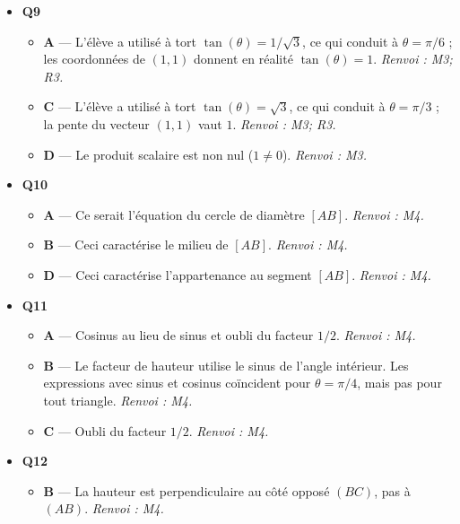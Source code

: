 \begin{itemize}
\begin{itemize}
    \item \textbf{C} — $\Vert\vec{u}\Vert = \Vert\vec{v}\Vert = \sqrt{13}$ : leurs normes sont égales, et non différentes. \emph{Renvoi : M3.}
    \item \textbf{D} — Des vecteurs de sens contraire sont colinéaires avec un coefficient négatif ; ici leur déterminant vaut $-13 \neq 0$, donc ils ne sont pas colinéaires. \emph{Renvoi : M3.}
  \end{itemize}
  \item \textbf{Q9}
  \begin{itemize}
    \item \textbf{A} — L'élève a utilisé à tort $\tan(\theta)=1/\sqrt{3}$, ce qui conduit à $\theta=\pi/6$ ; les coordonnées de $(1,1)$ donnent en réalité $\tan(\theta)=1$. \emph{Renvoi : M3; R3.}
    \item \textbf{C} — L'élève a utilisé à tort $\tan(\theta)=\sqrt{3}$, ce qui conduit à $\theta=\pi/3$ ; la pente du vecteur $(1,1)$ vaut $1$. \emph{Renvoi : M3; R3.}
    \item \textbf{D} — Le produit scalaire est non nul ($1 \neq 0$). \emph{Renvoi : M3.}
  \end{itemize}
  \item \textbf{Q10}
  \begin{itemize}
    \item \textbf{A} — Ce serait l'équation du cercle de diamètre $[AB]$. \emph{Renvoi : M4.}
    \item \textbf{B} — Ceci caractérise le milieu de $[AB]$. \emph{Renvoi : M4.}
    \item \textbf{D} — Ceci caractérise l'appartenance au segment $[AB]$. \emph{Renvoi : M4.}
  \end{itemize}
  \item \textbf{Q11}
  \begin{itemize}
    \item \textbf{A} — Cosinus au lieu de sinus et oubli du facteur $1/2$. \emph{Renvoi : M4.}
    \item \textbf{B} — Le facteur de hauteur utilise le sinus de l'angle intérieur. Les expressions avec sinus et cosinus coïncident pour $\theta=\pi/4$, mais pas pour tout triangle. \emph{Renvoi : M4.}
    \item \textbf{C} — Oubli du facteur $1/2$. \emph{Renvoi : M4.}
  \end{itemize}
  \item \textbf{Q12}
  \begin{itemize}
    \item \textbf{B} — La hauteur est perpendiculaire au côté opposé $(BC)$, pas à $(AB)$. \emph{Renvoi : M4.}

\end{itemize}
\end{itemize}
